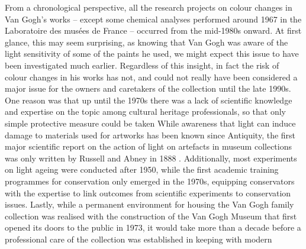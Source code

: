 From a chronological perspective, all the research projects on colour changes in Van Gogh's works – except some chemical analyses performed around 1967 in the Laboratoire des musées de France \citep[17, note 7]{cadorin_colour_1991} – occurred from the mid-1980s onward. At first glance, this may seem surprising, as knowing that Van Gogh was aware of the light sensitivity of some of the paints he used, we might expect this issue to have been investigated much earlier. Regardless of this insight, in fact the risk of colour changes in his works has not, and could not really have been considered a major issue for the owners and caretakers of the collection until the late 1990s. One reason was that up until the 1970s there was a lack of scientific knowledge and expertise on the topic among cultural heritage professionals, so that only simple protective measure could be taken While awareness that light can induce damage to materials used for artworks has been known since Antiquity, the first major scientific report on the action of light on artefacts in museum collections was only written by Russell and Abney in 1888 \citep{brommelle_russell_1964}. Additionally, most experiments on light ageing were conducted after 1950, while the first academic training programmes for conservation only emerged in the 1970s, equipping conservators with the expertise to link outcomes from scientific experiments to conservation issues. Lastly, while a permanent environment for housing the Van Gogh family collection was realised with the construction of the Van Gogh Museum that first opened its doors to the public in 1973, it would take more than a decade before a professional care of the collection was established in keeping with modern 